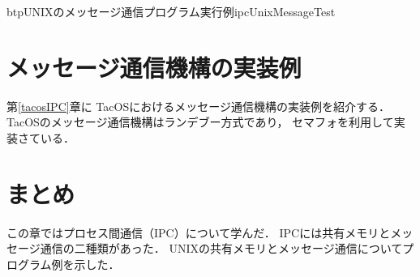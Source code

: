 \begin{myfig}{btp}{UNIXのメッセージ通信プログラム実行例}{ipcUnixMessageTest}
  
\end{myfig}

\section{メッセージ通信機構の実装例}
第\ref{tacosIPC}章に
TacOSにおけるメッセージ通信機構の実装例を紹介する．
TacOSのメッセージ通信機構はランデブー方式であり，
セマフォを利用して実装さている．

\section{まとめ}
この章ではプロセス間通信（IPC）について学んだ．
IPCには共有メモリとメッセージ通信の二種類があった．
UNIXの共有メモリとメッセージ通信についてプログラム例を示した．

